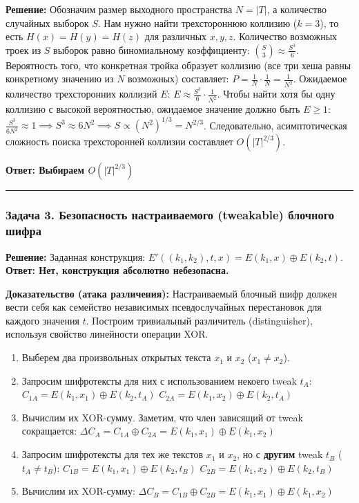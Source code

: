 ﻿\documentclass[9pt,a4paper]{extarticle}
\newcommand{\tightlist}{}
\begin{document}
\textbf{Решение:} Обозначим размер выходного пространства \(N = |T|\), а количество случайных выборок \(S\). Нам нужно найти трехстороннюю коллизию (\(k=3\)), то есть \(H(x) = H(y) = H(z)\) для различных \(x, y, z\). Количество возможных троек из \(S\) выборок равно биномиальному коэффициенту: \(\binom{S}{3} \approx \frac{S^3}{6}\). Вероятность того, что конкретная тройка образует коллизию (все три хеша равны конкретному значению из \(N\) возможных) составляет: \(P = \frac{1}{N} \cdot \frac{1}{N} = \frac{1}{N^2}\). Ожидаемое количество трехсторонних коллизий \(E\): \(E \approx \frac{S^3}{6} \cdot \frac{1}{N^2}\). Чтобы найти хотя бы одну коллизию с высокой вероятностью, ожидаемое значение должно быть \(E \ge 1\): \(\frac{S^3}{6N^2} \approx 1 \implies S^3 \approx 6N^2 \implies S \propto (N^2)^{1/3} = N^{2/3}\). Следовательно, асимптотическая сложность поиска трехсторонней коллизии составляет \(O(|T|^{2/3})\).

\textbf{Ответ: Выбираем \(O(|T|^{2/3})\)}

\begin{center}\rule{0.5\linewidth}{0.5pt}\end{center}

\subsubsection{Задача 3. Безопасность настраиваемого (tweakable) блочного шифра}\label{ux437ux430ux434ux430ux447ux430-3.-ux431ux435ux437ux43eux43fux430ux441ux43dux43eux441ux442ux44c-ux43dux430ux441ux442ux440ux430ux438ux432ux430ux435ux43cux43eux433ux43e-tweakable-ux431ux43bux43eux447ux43dux43eux433ux43e-ux448ux438ux444ux440ux430}

\textbf{Решение:} Заданная конструкция: \(E'((k_1,k_2), t, x) = E(k_1, x) \oplus E(k_2, t)\). \textbf{Ответ: Нет, конструкция абсолютно небезопасна.}

\textbf{Доказательство (атака различения):} Настраиваемый блочный шифр должен вести себя как семейство независимых псевдослучайных перестановок для каждого значения \(t\). Построим тривиальный различитель (distinguisher), используя свойство линейности операции XOR.

\begin{enumerate}
\def\labelenumi{\arabic{enumi}.}
\tightlist
\item
  Выберем два произвольных открытых текста \(x_1\) и \(x_2\) (\(x_1 \neq x_2\)).
\item
  Запросим шифротексты для них с использованием некоего tweak \(t_A\): \(C_{1A} = E(k_1, x_1) \oplus E(k_2, t_A)\) \(C_{2A} = E(k_1, x_2) \oplus E(k_2, t_A)\)
\item
  Вычислим их XOR-сумму. Заметим, что член зависящий от tweak сокращается: \(\Delta C_A = C_{1A} \oplus C_{2A} = E(k_1, x_1) \oplus E(k_1, x_2)\)
\item
  Запросим шифротексты для тех же текстов \(x_1\) и \(x_2\), но с \textbf{другим} tweak \(t_B\) (\(t_A \neq t_B\)): \(C_{1B} = E(k_1, x_1) \oplus E(k_2, t_B)\) \(C_{2B} = E(k_1, x_2) \oplus E(k_2, t_B)\)
\item
  Вычислим их XOR-сумму: \(\Delta C_B = C_{1B} \oplus C_{2B} = E(k_1, x_1) \oplus E(k_1, x_2)\)
\end{enumerate}
\end{document}

